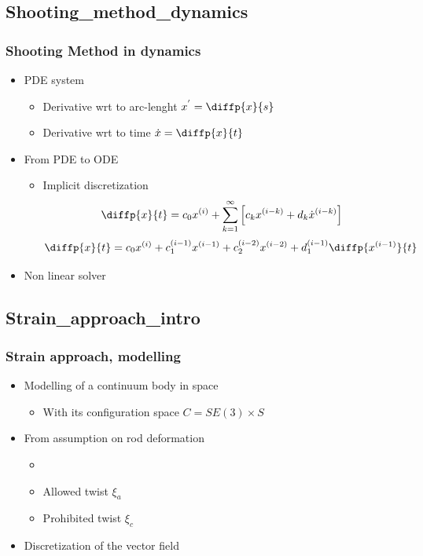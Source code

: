 \documentclass[compress]{thesisbeamer}
\begin{document}
		\subsection{Shooting_method_dynamics}
        \begin{frame}
        	\frametitle{Shooting Method in dynamics}
			\begin{itemize}%
				\item PDE system
				\begin{itemize}
					\item Derivative wrt to arc-lenght $ x^{'} = \diffp{x}{s} $
					\item Derivative wrt to time $\dot{x} = \diffp{x}{t} $
				\end{itemize}
				\item From PDE to ODE
				\begin{itemize}
					\item Implicit discretization
					\begin{equation}
						\diffp{x}{t} = {c}_{0} {x}^{(i)} + \sum_{k=1}^{\infty} {\left[{c}_{k} {x}^{\left(i-k \right)} + {d}_{k} {\dot{x}} ^ {\left(i-k \right)} \right]}
					\end{equation}
					\begin{equation}
						\diffp{x}{t} = {c}_{0} {x} ^ {\left(i \right)} + {c}_{1}^{\left(i-1 \right)} {x} ^ {\left(i-1 \right)} + {c}_{2}^{\left(i-2 \right)} {x} ^ {\left(i-2 \right)} + {d}_{1}^{\left(i-1 \right)} \diffp{x^{\left(i-1 \right)}}{t}
					\end{equation}
				\end{itemize}
  				\item Non linear solver
 			\end{itemize}
		\end{frame}
		
		\subsection{Strain_approach_intro}
        \begin{frame}
        	\frametitle{Strain approach, modelling}
			\begin{itemize}%
  				\item Modelling of a continuum body in space
  				\begin{itemize}
  					\item With its configuration space $ \textit{C} = SE(3) \times \textit{S} $
  				\end{itemize}
  				\item From assumption on rod deformation
  				\begin{itemize}
  					\item 
  					\item Allowed twist $ \xi_a $
  					\item Prohibited twist $ \xi_c $
  				\end{itemize}
  				\item Discretization of the vector field
 			\end{itemize}
		\end{frame}
		
\end{document}
